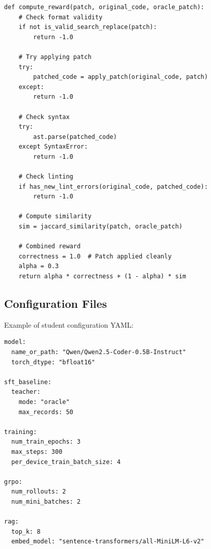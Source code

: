 \documentclass{article} %
\begin{document}
\begin{verbatim}
def compute_reward(patch, original_code, oracle_patch):
    # Check format validity
    if not is_valid_search_replace(patch):
        return -1.0

    # Try applying patch
    try:
        patched_code = apply_patch(original_code, patch)
    except:
        return -1.0

    # Check syntax
    try:
        ast.parse(patched_code)
    except SyntaxError:
        return -1.0

    # Check linting
    if has_new_lint_errors(original_code, patched_code):
        return -1.0

    # Compute similarity
    sim = jaccard_similarity(patch, oracle_patch)

    # Combined reward
    correctness = 1.0  # Patch applied cleanly
    alpha = 0.3
    return alpha * correctness + (1 - alpha) * sim
\end{verbatim}

\subsection{Configuration Files}

Example of student configuration YAML:

\begin{verbatim}
model:
  name_or_path: "Qwen/Qwen2.5-Coder-0.5B-Instruct"
  torch_dtype: "bfloat16"

sft_baseline:
  teacher:
    mode: "oracle"
    max_records: 50

training:
  num_train_epochs: 3
  max_steps: 300
  per_device_train_batch_size: 4

grpo:
  num_rollouts: 2
  num_mini_batches: 2

rag:
  top_k: 8
  embed_model: "sentence-transformers/all-MiniLM-L6-v2"
\end{verbatim}
\end{document}
